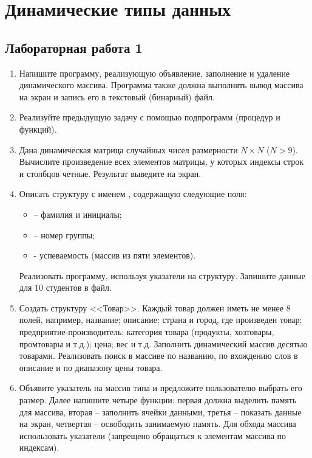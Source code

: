 \chapter{Динамические типы данных}
\section{Лабораторная работа 1}
\begin{enumerate}[leftmargin=*]
    \item Напишите программу, реализующую объявление, заполнение и удаление динамического массива. Программа также должна выполнять вывод массива на экран и запись его в текстовый (бинарный) файл.
    \item Реализуйте предыдущую задачу с помощью подпрограмм (процедур и функций).
    \item Дана динамическая матрица случайных чисел размерности $N\times N$ ($N>9$). Вычислите произведение всех элементов матрицы, у которых индексы строк и столбцов четные. Результат выведите на экран.
    \item Описать структуру с именем , содержащую следующие поля:
        \begin{itemize}
            \item {} – фамилия и инициалы;
            \item {} – номер группы;
            \item {} - успеваемость (массив из пяти элементов).
        \end{itemize}
    Реализовать программу, используя указатели на структуру. Запишите данные для 10 студентов в файл.
    \item Создать структуру <<Товар>>. Каждый товар должен иметь не менее 8 полей, например, название; описание; страна и город, где произведен товар; предприятие-производитель; категория товара (продукты, хозтовары, промтовары и т.д.); цена; вес и т.д. Заполнить динамический массив десятью товарами. Реализовать поиск в массиве по названию, по вхождению слов в описание и по диапазону цены товара.
    \item Объявите указатель на массив типа  и предложите пользователю выбрать его размер. Далее напишите четыре функции: первая должна выделить память для массива, вторая – заполнить ячейки данными, третья – показать данные на экран, четвертая – освободить занимаемую память. Для обхода массива использовать указатели (запрещено обращаться к элементам массива по индексам).
\end{enumerate}
